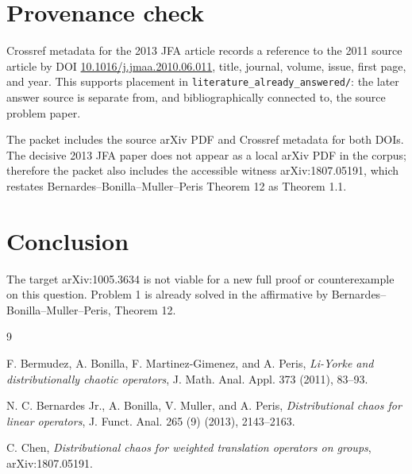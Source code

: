 \documentclass[11pt]{article}
\begin{document}
\section*{Provenance check}

Crossref metadata for the 2013 JFA article records a reference to the 2011
source article by DOI
\href{https://doi.org/10.1016/j.jmaa.2010.06.011}{10.1016/j.jmaa.2010.06.011},
title, journal, volume, issue, first page, and year.  This supports placement
in \texttt{literature\_already\_answered/}: the later answer source is
separate from, and bibliographically connected to, the source problem paper.

The packet includes the source arXiv PDF and Crossref metadata for both DOIs.
The decisive 2013 JFA paper does not appear as a local arXiv PDF in the corpus;
therefore the packet also includes the accessible witness arXiv:1807.05191,
which restates Bernardes--Bonilla--Muller--Peris Theorem 12 as Theorem 1.1.

\section*{Conclusion}

The target arXiv:1005.3634 is not viable for a new full proof or
counterexample on this question.  Problem 1 is already solved in the
affirmative by Bernardes--Bonilla--Muller--Peris, Theorem 12.

\begin{thebibliography}{9}

F. Bermudez, A. Bonilla, F. Martinez-Gimenez, and A. Peris,
\emph{Li-Yorke and distributionally chaotic operators},
J. Math. Anal. Appl. 373 (2011), 83--93.

N. C. Bernardes Jr., A. Bonilla, V. Muller, and A. Peris,
\emph{Distributional chaos for linear operators},
J. Funct. Anal. 265 (9) (2013), 2143--2163.

C. Chen,
\emph{Distributional chaos for weighted translation operators on groups},
arXiv:1807.05191.

\end{thebibliography}
\end{document}
